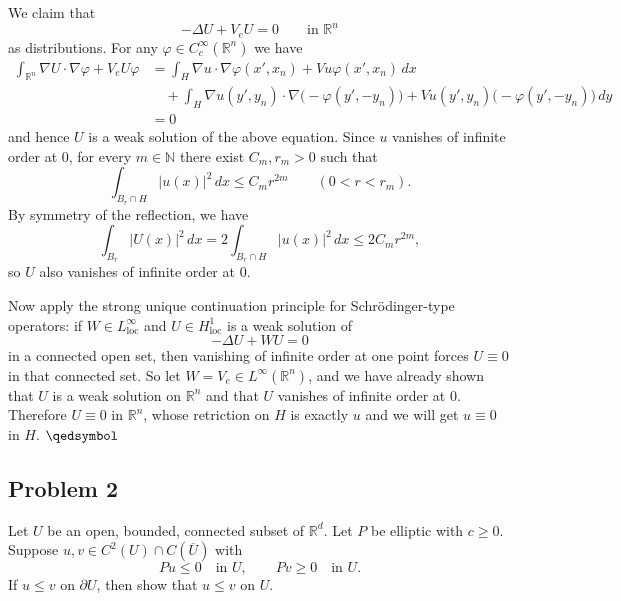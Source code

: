 \documentclass[lang=en,11pt,a4paper,citestyle=authoryear]{elegantpaper}
\newcommand{\prvd}{$\hfill \qedsymbol$}
\newcommand{\R}{\mathbb{R}}
\newcommand{\N}{\mathbb{N}}
\begin{document}
We claim that
\[
-\Delta U + V_eU = 0 \qquad \text{in }\R^n
\]
as distributions. For any $\varphi\in C_c^\infty(\R^n)$ we have
\[
\begin{aligned}
\int_{\R^n} \nabla U\cdot \nabla \varphi + V_eU\varphi
&= \int_H \nabla u\cdot \nabla \varphi(x',x_n) + Vu\varphi(x',x_n)\,dx\\
&\quad + \int_H \nabla u(y',y_n)\cdot \nabla \bigl(-\varphi(y',-y_n)\bigr)
   + Vu(y',y_n)\bigl(-\varphi(y',-y_n)\bigr)\,dy \\
& = 0
\end{aligned}
\]
and hence $U$ is a weak solution of the above equation. Since $u$ vanishes of infinite order at $0$, for every $m\in\N$ there exist $C_m,r_m>0$ such that
\[
\int_{B_r\cap H} |u(x)|^2\,dx \leq C_m r^{2m}
\qquad (0<r<r_m).
\]
By symmetry of the reflection, we have
\[
\int_{B_r} |U(x)|^2\,dx = 2\int_{B_r\cap H} |u(x)|^2\,dx \leq 2C_m r^{2m},
\]
so $U$ also vanishes of infinite order at $0$.

Now apply the strong unique continuation principle for Schr\"odinger-type operators: if $W\in L^\infty_{\mathrm{loc}}$ and $U\in H^1_{\mathrm{loc}}$ is a weak solution of
\[
-\Delta U + WU=0
\]
in a connected open set, then vanishing of infinite order at one point forces $U\equiv 0$ in that connected set. So let $W=V_e\in L^\infty(\R^n)$, and we have already shown that $U$ is a weak solution on $\R^n$ and that $U$ vanishes of infinite order at $0$. Therefore $U\equiv 0$ in $\R^n$, whose retriction on $H$ is exactly $u$ and we will 
get $u\equiv 0$ in $H$. \prvd

\vspace{0.5em}

\subsection*{Problem 2}
Let $U$ be an open, bounded, connected subset of $\R^d$. Let $P$ be elliptic with $c\geq 0$. Suppose $u,v\in C^2(U)\cap C(\overline U)$ with
\[
Pu\leq 0 \quad \text{in }U,
\qquad Pv\geq 0 \quad \text{in }U.
\]
If $u\leq v$ on $\partial U$, then show that $u\leq v$ on $U$.
\end{document}
